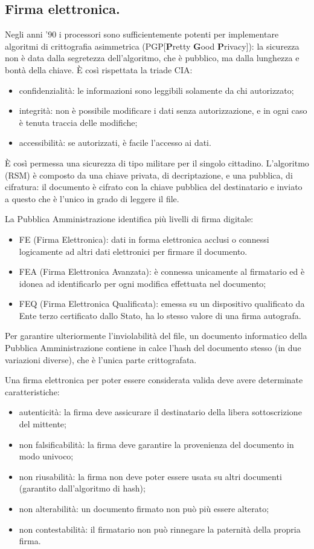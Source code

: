\documentclass[a4page, 11pt, twocolumn]{article}
\begin{document}
\subsection{Firma elettronica.}
Negli anni '90 i processori sono sufficientemente potenti per implementare algoritmi di crittografia asimmetrica (PGP[\textbf{P}retty \textbf{G}ood\textbf{ P}rivacy]): la sicurezza non è data dalla segretezza dell'algoritmo, che è pubblico, ma dalla lunghezza e bontà della chiave.
È così rispettata la triade CIA:
\begin{itemize}
\item confidenzialità: le informazioni sono leggibili solamente da chi autorizzato;
\item integrità: non è possibile modificare i dati senza autorizzazione, e in ogni caso è tenuta traccia delle modifiche;
\item accessibilità: se autorizzati, è facile l'accesso ai dati.
\end{itemize}
È così permessa una sicurezza di tipo militare per il singolo cittadino.
L'algoritmo (RSM) è composto da una chiave privata, di decriptazione, e una pubblica, di cifratura: il documento è cifrato con la chiave pubblica del destinatario e inviato a questo che è l'unico in grado di leggere il file.

La Pubblica Amministrazione identifica più livelli di firma digitale:
\begin{itemize}
\item FE (Firma Elettronica): dati in forma elettronica acclusi o connessi logicamente ad altri dati elettronici per firmare il documento.
\item FEA (Firma Elettronica Avanzata): è connessa unicamente al firmatario ed è idonea ad identificarlo per ogni modifica effettuata nel documento;
\item FEQ (Firma Elettronica Qualificata): emessa su un dispositivo qualificato da Ente terzo certificato dallo Stato, ha lo stesso valore di una firma autografa.
\end{itemize}
Per garantire ulteriormente l'inviolabilità del file, un documento informatico della Pubblica Amministrazione contiene in calce l'hash del documento stesso (in due variazioni diverse), che è l'unica parte crittografata.

Una firma elettronica per poter essere considerata valida deve avere determinate caratteristiche:
\begin{itemize}
\item autenticità: la firma deve assicurare il destinatario della libera sottoscrizione del mittente;
\item non falsificabilità: la firma deve garantire la provenienza del documento in modo univoco;
\item non riusabilità: la firma non deve poter essere usata su altri documenti (garantito dall'algoritmo di hash);
\item non alterabilità: un documento firmato non può più essere alterato;
\item non contestabilità: il firmatario non può rinnegare la paternità della propria firma.
\end{itemize}
\end{document}
